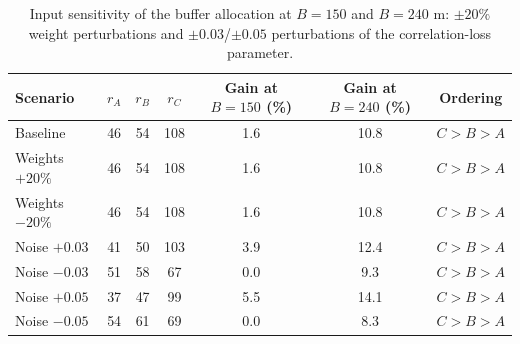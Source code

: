 \begin{table}[!ht]
\centering
\caption{Input sensitivity of the buffer allocation at $B=150$ and $B=240$ m: $\pm20\%$ weight perturbations and $\pm0.03$/$\pm0.05$ perturbations of the correlation-loss parameter.}
\label{tab:p7sens}
\small
\begin{tabular}{lcccccc}
\toprule
Scenario & $r_A$ & $r_B$ & $r_C$ & Gain at $B=150$ (\%) & Gain at $B=240$ (\%) & Ordering \\
\midrule
Baseline & 46 & 54 & 108 & 1.6 & 10.8 & $C>B>A$ \\
Weights $+20\%$ & 46 & 54 & 108 & 1.6 & 10.8 & $C>B>A$ \\
Weights $-20\%$ & 46 & 54 & 108 & 1.6 & 10.8 & $C>B>A$ \\
Noise $+0.03$ & 41 & 50 & 103 & 3.9 & 12.4 & $C>B>A$ \\
Noise $-0.03$ & 51 & 58 & 67 & 0.0 & 9.3 & $C>B>A$ \\
Noise $+0.05$ & 37 & 47 & 99 & 5.5 & 14.1 & $C>B>A$ \\
Noise $-0.05$ & 54 & 61 & 69 & 0.0 & 8.3 & $C>B>A$ \\
\bottomrule
\end{tabular}
\end{table}